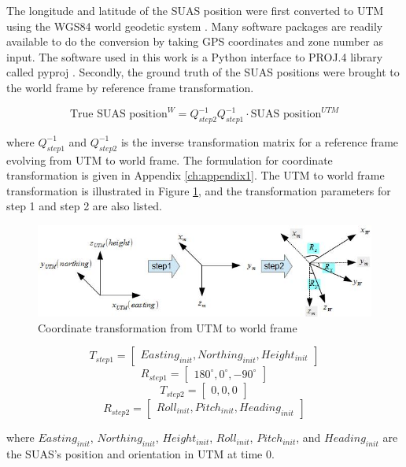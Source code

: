 The longitude and latitude of the SUAS position were first converted
to UTM using the WGS84 world geodetic system \cite{_world_????}. Many
software packages are readily available to do the conversion by taking GPS
coordinates and zone number as input. The software used in this work is
a Python interface to PROJ.4 library \cite{_pyproj_????} called pyproj
\cite{_pyproj_????}. Secondly, the ground truth of the SUAS positions
were brought to the world frame by reference frame transformation.

$$\text{True SUAS position}^W = 
Q_{step2}^{-1}Q_{step1}^{-1} \cdot\text{SUAS position}^{UTM}$$

\noindent where $Q_{step1}^{-1}$ and $Q_{step2}^{-1}$ is the inverse
transformation matrix for a reference frame evolving from UTM to world
frame. The formulation for coordinate transformation is given in
Appendix \ref{ch:appendix1}. The UTM to world frame transformation is
illustrated in Figure \ref{fig:utm_to_world}, and the transformation
parameters for step 1 and step 2 are also listed.

\begin{figure}[h]
  \centering
  \includegraphics[width=12cm,keepaspectratio=true]{./Figures/utm_to_world.jpg}
  \caption{Coordinate transformation from UTM to world frame}
  \label{fig:utm_to_world}
\end{figure}

$$T_{step1} = \begin{bmatrix}Easting_{init}, Northing_{init},
  Height_{init}\end{bmatrix}$$
$$R_{step1} = \begin{bmatrix}180^{\circ}, 0^{\circ},
  -90^{\circ}\end{bmatrix}$$
$$T_{step2} = \begin{bmatrix}0, 0, 0\end{bmatrix}$$
$$R_{step2} = \begin{bmatrix}Roll_{init}, Pitch_{init},
  Heading_{init}\end{bmatrix}$$

\noindent where $Easting_{init}$, $Northing_{init}$,
$Height_{init}$, $Roll_{init}$, $Pitch_{init}$, and
$Heading_{init}$ are the SUAS's position and orientation in UTM at time 0. 

